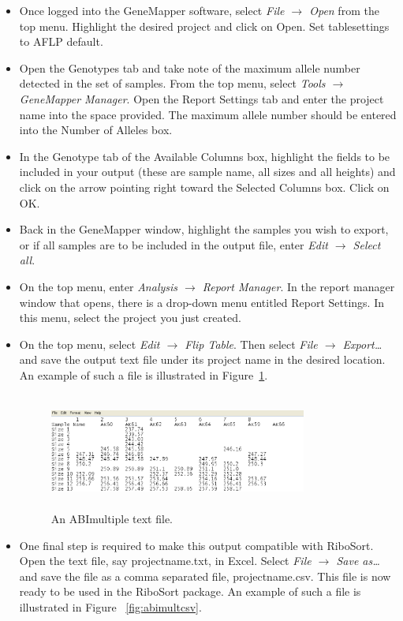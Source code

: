 \documentclass[a4paper]{article}
\begin{document}
\begin{itemize}
\item Once logged into the GeneMapper software, select {\em File $\rightarrow$ Open} from the top menu. Highlight the desired project and click on Open. Set tablesettings to AFLP default.
\item Open the Genotypes tab and take note of the maximum allele number detected in the set of samples. From the top menu, select {\em Tools $\rightarrow$ GeneMapper Manager}. Open the Report Settings tab and enter the project name into the space provided. The maximum allele number should be entered into the Number of Alleles box.
\item In the Genotype tab of the Available Columns box, highlight the fields to be included in your output (these are sample name, all sizes and all heights) and click on the arrow pointing right toward the Selected Columns box. Click on OK.
\item  Back in the GeneMapper window, highlight the samples you wish to export, or if all samples are to be included in the output file, enter {\em Edit $\rightarrow$ Select all}.
\item On the top menu, enter {\em Analysis $\rightarrow$ Report Manager}. In the report manager window that opens, there is a drop-down menu entitled Report Settings. In this menu, select the project you just created.
\item On the top menu, select {\em Edit $\rightarrow$ Flip Table}. Then select {\em File $\rightarrow$ Export\ldots} and save the output text file under its project name in the desired location. An example of such a file is illustrated in Figure~\ref{fig:abimulttxt}.

\begin{figure}
\centering
\includegraphics[width=0.8\textwidth,height=1.5in]{EPS/picabimultipletxt.eps}
\caption{An ABImultiple text file.}
\label{fig:abimulttxt}
\end{figure}

\item One final step is required to make this output compatible with RiboSort. Open the text file, say projectname.txt, in Excel. Select {\em File $\rightarrow$ Save as\ldots} and save the file as a comma separated file, projectname.csv. This file is now ready to be used in the RiboSort package. An example of such a file is illustrated in Figure ~\ref{fig:abimultcsv}.


\end{itemize}
\end{document}

